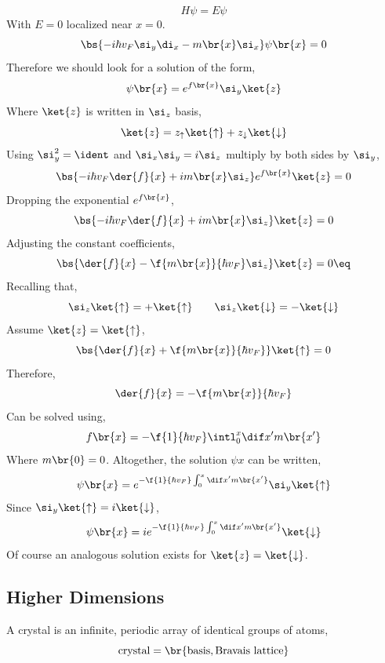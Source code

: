 \documentclass{article}
\begin{document}
\[  H \psi = E \psi \]
With $E = 0$ localized near $x = 0$.
\[ \bs{- i \hbar v_F \si_y \di_x - m\br{x} \si_x} \psi\br{x} = 0 \]
Therefore we should look for a solution of the form,
\[ \psi\br{x} = e^{f\br{x}} \si_y \ket{z} \]
Where $\ket{z}$ is written in $\si_z$ basis,
\[ \ket{z} = z_{\uparrow} \ket{\uparrow} + z_{\downarrow} \ket{\downarrow} \]
Using $\si_y^2 = \ident$ and $\si_x \si_y = i \si_z$ multiply by both sides by $\si_y$,
\[ \bs{-i \hbar v_F \der{f}{x} + i m\br{x} \si_z} e^{f\br{x}}\ket{z} = 0 \]
Dropping the exponential $e^{f\br{x}}$,
\[ \bs{-i \hbar v_F \der{f}{x} + i m\br{x} \si_z} \ket{z} = 0 \]
Adjusting the constant coefficients,
\[ \bs{\der{f}{x} - \f{m\br{x}}{\hbar v_F} \si_z} \ket{z} = 0 \eq \label{eq:mass_varying_eqn}\]
Recalling that,
\[ \si_{z}\ket{\uparrow} = + \ket{\uparrow} \qquad \si_{z}\ket{\downarrow} = - \ket{\downarrow} \]
Assume $\ket{z} = \ket{\uparrow}$,
\[ \bs{\der{f}{x} + \f{m\br{x}}{\hbar v_F}} \ket{\uparrow} = 0 \]
Therefore,
\[ \der{f}{x} = - \f{m\br{x}}{\hbar v_F} \]
Can be solved using,
\[ f\br{x} = - \f{1}{\hbar v_F} \intl_{0}^{x} \dif x' m\br{x'} \]
Where $m\br{0} = 0$. Altogether, the solution $\psi{x}$ can be written,
\[ \psi\br{x} = e^{- \f{1}{\hbar v_F} \int_{0}^{x} \dif x' m\br{x'}} \si_y \ket{\uparrow} \]
Since $\si_y \ket{\uparrow} = i \ket{\downarrow}$,
\[ \psi\br{x} = ie^{- \f{1}{\hbar v_F} \int_{0}^{x} \dif x' m\br{x'}}\ket{\downarrow} \]
Of course an analogous solution exists for $\ket{z} = \ket{\downarrow}$.
\begin{center}
\end{center}

\subsection{Higher Dimensions}

A crystal is an infinite, periodic array of identical groups of atoms,
\[ \text{crystal} = \br{\text{basis}, \text{Bravais lattice}} \]

\begin{center}
\end{center}
\end{document}
